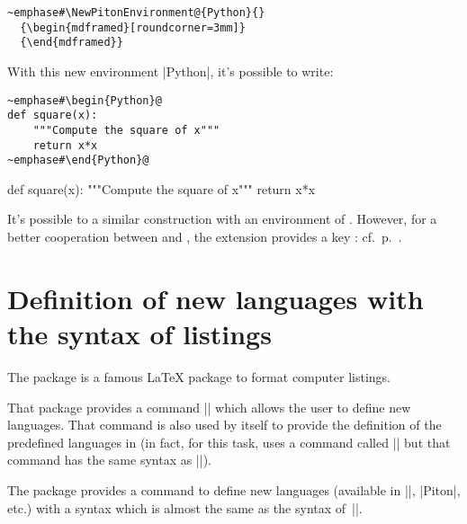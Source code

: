 \documentclass{article}
\begin{document}
\begin{Verbatim}
~emphase#\NewPitonEnvironment@{Python}{}
  {\begin{mdframed}[roundcorner=3mm]}
  {\end{mdframed}}
\end{Verbatim}

\bigskip
With this new environment |{Python}|, it's possible to write:

\begin{Verbatim}
~emphase#\begin{Python}@
def square(x):
    """Compute the square of x"""
    return x*x
~emphase#\end{Python}@
\end{Verbatim}

  {\begin{mdframed}[roundcorner=3mm]}
  {\end{mdframed}}

\begin{Python}
def square(x):
    """Compute the square of x"""
    return x*x
\end{Python}

\bigskip
It's possible to a similar construction with an environment of .
However, for a better cooperation between  and , the
extension  provides a key : cf.~p.~\pageref{tcolorbox}.


\section{Definition of new languages with the syntax of listings}

\label{NewPitonLanguage}

\medskip
The package  is a famous LaTeX package to format computer
listings.

That package provides a command |\lstdefinelanguage| which allows the user to
define new languages. That command is also used by  itself to
provide the definition of the predefined languages in  (in fact,
for this task,  uses a command called |\lst@definelanguage| but
that command has the same syntax as |\lstdefinelanguage|). 

\medskip
The package  provides a command
 to define new languages (available in
|\piton|, |{Piton}|, etc.) with a syntax which is almost the same as the
syntax of~|\lstdefinelanguage|.
\end{document}
